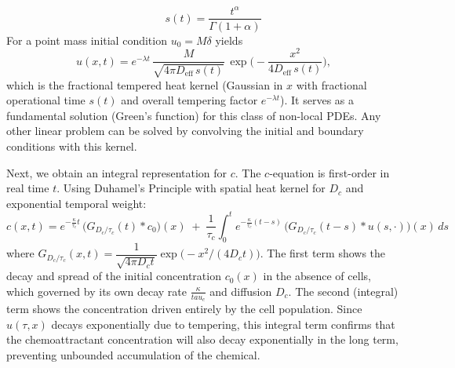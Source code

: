 \documentclass{article}
\begin{document}
\begin{description}
\begin{itemize}
\begin{equation*}
\qquad s(t)=\frac{t^\alpha}{\Gamma(1+\alpha)}\; 
\end{equation*}
For a point mass initial condition $u_0=M\delta$ yields
\begin{equation}\label{eq:IIIB_u_example}
u(x,t)=e^{-\lambda t}\,\frac{M}{\sqrt{4\pi D_{\mathrm{eff}}\,s(t)}}\,
\exp\!\Big(-\frac{x^2}{4D_{\mathrm{eff}}\,s(t)}\Big),
\end{equation}
which is the fractional tempered heat kernel (Gaussian in $x$ with fractional operational time $s(t)$ and overall tempering factor $e^{-\lambda t}$). It serves as a fundamental solution (Green's function) for this class of non-local PDEs. Any other linear problem can be solved by convolving the initial and boundary conditions with this kernel.
\par 
Next, we obtain an integral representation for $c$. The $c$-equation is first-order in real time $t$. Using Duhamel's Principle with spatial heat kernel for $D_c$ and exponential temporal weight:
\begin{equation}\label{eq:IIIB_c}
c(x,t)=e^{-\frac{\kappa}{\tau_c}t}\,\big(G_{D_c/\tau_c}(t)\!*c_0\big)(x)
\;+\;\frac{1}{\tau_c}\int_0^t e^{-\frac{\kappa}{\tau_c}(t-s)}\,
\big(G_{D_c/\tau_c}(t-s)\!*u(s,\cdot)\big)(x)\,ds
\end{equation}
where $G_{D_c/\tau_c}(x,t)=\dfrac{1}{\sqrt{4\pi D_c t}}\exp\!\big(-x^2/(4D_c t)\big)$.
 The first term shows the decay and spread of the initial concentration $c_0(x)$ in the absence of cells, which governed by its own decay rate $\frac{\kappa}{tau_c}$
 and diffusion $D_c.$ The second (integral) term shows the concentration driven entirely by the cell population. 
 Since $u(\tau ,x)$ decays exponentially due to tempering, this integral term confirms that the chemoattractant concentration will also decay exponentially in the long term, preventing unbounded accumulation of the chemical.
\end{itemize}
\end{description}
\end{document}
